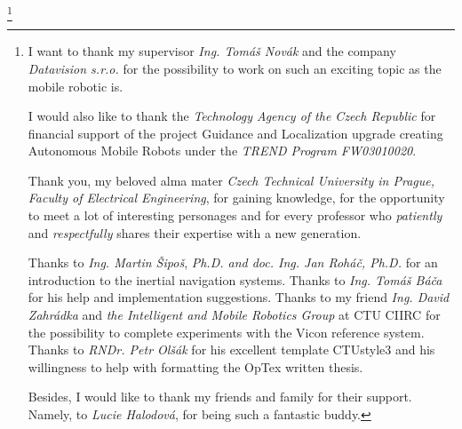 \thanks {I want to thank my supervisor {\it Ing. Tomáš Novák} and the company {\it Datavision s.r.o.} for the possibility to work on such an exciting topic as the mobile robotic is.

I would also like to thank the {\it Technology Agency of the Czech Republic} for financial support of the project Guidance and Localization upgrade creating Autonomous Mobile Robots under the {\it TREND Program FW03010020}.

Thank you, my beloved alma mater {\it Czech Technical University in Prague, Faculty of Electrical Engineering}, for gaining knowledge, for the opportunity to meet a lot of interesting personages and for every professor who {\it patiently} and {\it respectfully} shares their expertise with a new generation.

Thanks to {\it Ing. Martin Šipoš}, {\it Ph.D. and doc. Ing. Jan Roháč, Ph.D.} for an introduction to the inertial navigation systems.
Thanks to {\it Ing. Tomáš Báča} for his help and implementation suggestions.
Thanks to my friend {\it Ing. David Zahrádka} and {\it the Intelligent and Mobile Robotics Group} at CTU CIIRC for the possibility to complete experiments with the Vicon reference system.
Thanks to {\it RNDr. Petr Olšák} for his excellent template CTUstyle3 and his willingness to help with formatting the OpTex written thesis.

Besides, I would like to thank my friends and family for their support. Namely, to {\it Lucie Halodová}, for being such a fantastic buddy.}

\makefront



% 















\bye
